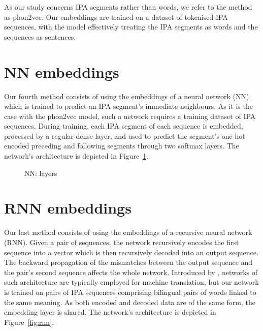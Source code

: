 \documentclass[a4paper]{report}
\begin{document}
As our study concerns IPA segments rather than words, we refer to the method as phon2vec.
Our embeddings are trained on a dataset of tokenised IPA sequences,
with the model effectively treating the IPA segments as words and the sequences as sentences.


\section{NN embeddings}

Our fourth method consists of using the embeddings of a neural network (NN) which is trained to predict an IPA segment's immediate neighbours.
As it is the case with the phon2vec model, such a network requires a training dataset of IPA sequences.
During training, each IPA segment of each sequence is embedded, processed by a regular dense layer,
and used to predict the segment's one-hot encoded preceding and following segments through two softmax layers.
The network's architecture is depicted in Figure~\ref{fig:nn}.

\begin{figure}[h]
	\centering\small


	\caption{NN: layers}
	\label{fig:nn}
\end{figure}


\section{RNN embeddings}

Our last method consists of using the embeddings of a recursive neural network (RNN).
Given a pair of sequences, the network recursively encodes the first sequence into a vector which is then recursively decoded into an output sequence.
The backward propagation of the mismatches between the output sequence and the pair's second sequence affects the whole network.
Introduced by \citet{2014_Cho_al}, networks of such architecture are typically employed for machine translation,
but our network is trained on pairs of IPA sequences comprising bilingual pairs of words linked to the same meaning.
As both encoded and decoded data are of the same form, the embedding layer is shared.
The network's architecture is depicted in Figure~\ref{fig:rnn}.
\end{document}
